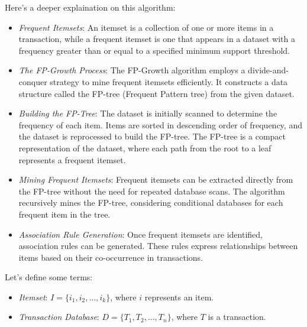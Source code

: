 \documentclass[12pt,a4paper,openright,twoside]{book}
\begin{document}
\begin{enumerate}
        Here's a deeper explaination on this algorithm:

        \begin{itemize}

            \item \emph{Frequent Itemsets}: An itemset is a collection of one or more items in a transaction, while a frequent itemset is one that appears in a dataset with a frequency greater than or equal to a specified minimum support threshold.
            
            \item \emph{The FP-Growth Process}: The FP-Growth algorithm employs a divide-and-conquer strategy to mine frequent itemsets efficiently. It constructs a data structure called the FP-tree (Frequent Pattern tree) from the given dataset.
            
            \item \emph{Building the FP-Tree}: The dataset is initially scanned to determine the frequency of each item. Items are sorted in descending order of frequency, and the dataset is reprocessed to build the FP-tree. The FP-tree is a compact representation of the dataset, where each path from the root to a leaf represents a frequent itemset.

            \item \emph{Mining Frequent Itemsets}: Frequent itemsets can be extracted directly from the FP-tree without the need for repeated database scans. The algorithm recursively mines the FP-tree, considering conditional databases for each frequent item in the tree.

            \item \emph{Association Rule Generation}: Once frequent itemsets are identified, association rules can be generated. These rules express relationships between items based on their co-occurrence in transactions.

        \end{itemize}

        Let's define some terms:

        \begin{itemize}

            \item \emph{Itemset}: $I = \{i_1, i_2, \ldots, i_k\}$, where $i$ represents an item.

            \item \emph{Transaction Database}: $D = \{T_1, T_2, \ldots, T_n\}$, where $T$ is a transaction.


\end{itemize}
\end{enumerate}
\end{document}
